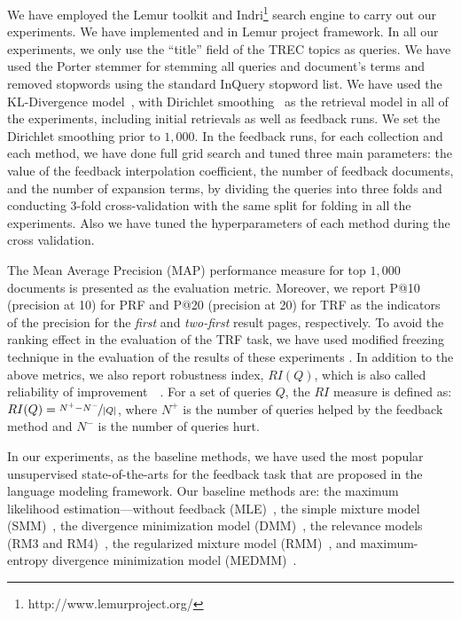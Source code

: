 We have employed the Lemur toolkit and Indri\footnote{http://www.lemurproject.org/} search engine to carry out our experiments. We have implemented \acswlm and \acrswlm in Lemur project framework. 
In all our experiments, we only use the ``title'' field of the TREC topics as queries. 
We have used the Porter stemmer for stemming all queries and document's terms and removed stopwords using the standard InQuery stopword list. 
We have used the KL-Divergence model~\citep{Lafferty:2001}, with Dirichlet smoothing~\citep{Zhai:2001} as the retrieval model in all of the experiments, including initial retrievals as well as feedback runs.
We set the Dirichlet smoothing prior to $1,000$.  In the feedback runs, for each collection and each method, we have done full grid search and tuned three main parameters: the value of the feedback interpolation coefficient, the number of feedback documents, and the number of expansion terms, by dividing the queries into three folds and conducting 3-fold cross-validation with the same split for folding in all the experiments.  Also we have tuned the hyperparameters of each method during the cross validation.

%
The Mean Average Precision (MAP) performance measure for top $1,000$ documents is presented as the evaluation metric. 
Moreover, we report P@10 (precision at 10) for PRF and P@20 (precision at 20) for TRF as the indicators of the precision for the \emph{first} and \emph{two-first} result pages, respectively.  
To avoid the ranking effect in the evaluation of the TRF task, we have used modified freezing technique in the evaluation of the results of these experiments \citep{cirillo:1969,Harman:1992,Ruthven:2003}. In addition to the above metrics, we also report robustness index, $RI(Q)$, which is also called reliability of improvement~~\citep{Collins-Thompson:2007}. For a set of
queries $Q$, the $RI$ measure is defined as: $RI(Q) = \nicefrac{N^+ - N^-}{|Q|}$, where $N^+$ is the number of queries helped by the feedback method and $N^-$ is the number of queries hurt.

In our experiments, as the baseline methods, we have used the most popular unsupervised state-of-the-arts for the feedback task that are proposed in the language modeling framework. 
Our baseline methods are: the maximum likelihood estimation\:---\:without feedback (MLE)~\citep{Lafferty:2001}, the simple mixture model (SMM)~\citep{Zhai:SMM:2001},  the divergence minimization model (DMM)~\citep{Zhai:SMM:2001}, the relevance models (RM3 and RM4)~\citep{Abdul-jaleel:2004,Lavrenko:2001}, the regularized mixture model (RMM)~\citep{Tao:2006}, and maximum-entropy divergence minimization model (MEDMM)~\citep{Lv:2014}. 


